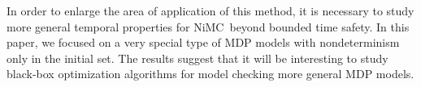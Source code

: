 \documentclass[11pt]{article}
\theoremstyle{definition}
\newcommand{\modelname}{NiMC\xspace}
\begin{document}
In order to enlarge the area of application of this method, it is necessary to study more general temporal properties for \modelname\ beyond bounded time safety. In this paper, we focused on a very special type of MDP models with nondeterminism only in the initial set. The results suggest that it will be  interesting to study black-box optimization algorithms for model checking more general MDP models.



%

\end{document}
